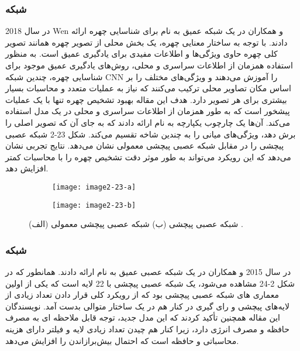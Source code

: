 \subsubsection{	شبکه }
در سال 2018 Wen و همکاران در \cite{WEN201894} یک شبکه عمیق به نام  برای شناسایی چهره ارائه دادند. با توجه به ساختار معنایی چهره، یک بخش محلی از تصویر چهره همانند تصویر کلی چهره حاوی ویژگی‌ها و اطلاعات مفیدی برای یادگیری عمیق است. به منظور استفاده همزمان از اطلاعات سراسری و محلی، روش‌های یادگیری عمیق موجود برای شناسایی چهره، چندین شبکه CNN را آموزش می‌دهند و ویژگی‌های مختلف را بر اساس مکان تصاویر محلی ترکیب می‌کنند که نیاز به عملیات متعدد و محاسبات بسیار بیشتری برای هر تصویر دارد. هدف این مقاله بهبود تشخیص چهره تنها با یک عملیات پیشخور  است که به طور همزمان از اطلاعات سراسری و محلی در یک مدل استفاده می‌کند. آن‌ها یک چارچوب یکپارچه به نام  ارائه دادند که به جای آن که تصویر اصلی را برش دهد، ویژگی‌های میانی را به چندین شاخه تقسیم می‌کند. شکل ‏2-23 شبکه عصبی پیچشی  را در مقابل شبکه عصبی پیچشی معمولی نشان می‌دهد. نتایج تجربی نشان می‌دهد که این رویکرد می‌تواند به طور موثر دقت تشخیص چهره را با محاسبات کمتر افزایش دهد. 
 	 
\begin{figure}
\begin{subfigure}{.5\textwidth}
  \centering
  \texttt{[image: image2-23-a]}
  \label{image2-23-a}
\end{subfigure}
\begin{subfigure}{.5\textwidth}
  \centering
  \texttt{[image: image2-23-b]}
  \label{image2-23-b}
\end{subfigure}
  \caption{ (الف) شبکه عصبی پیچشی   (ب) شبکه عصبی پیچشی معمولی \cite{ref1}.}
\label{fig:image2-23}
\end{figure}

\subsubsection{	شبکه }
در سال 2015  و همکاران در \cite{7298594} یک شبکه عصبی عمیق به نام  ارائه دادند. همانطور که در شکل 2-24 مشاهده می‌شود،  یک شبکه عصبی پیچشی با 22 لایه است که یکی از اولین معماری های شبکه عصبی پیچشی بود که از رویکرد کلی قرار دادن تعداد زیادی از لایه‌های پیچشی و رای گیری  در کنار هم در یک ساختار متوالی بدست آمد. نویسندگان این مقاله همچنین تأکید کردند که این مدل جدید، توجه قابل ملاحظه ای به مصرف حافظه و مصرف انرژی دارد، زیرا کنار هم چیدن تعداد زیادی لایه و فیلتر دارای هزینه محاسباتی و حافظه است که احتمال بيش‌برازاندن  را افزایش می‌دهد.
 
